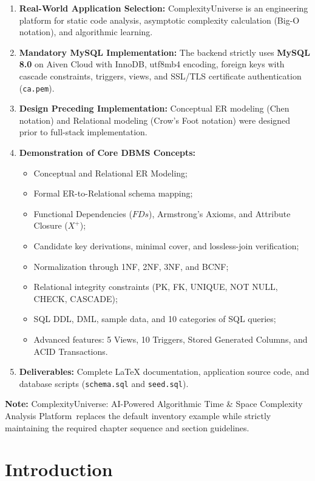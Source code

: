 \documentclass[12pt,a4paper]{report}
\DeclareRobustCommand{\_}{\textunderscore\allowbreak}
\newcommand{\projecttitle}{ComplexityUniverse: AI-Powered Algorithmic Time \& Space Complexity Analysis Platform}
\begin{document}
\begin{enumerate}
    \item \textbf{Real-World Application Selection:} ComplexityUniverse is an engineering platform for static code analysis, asymptotic complexity calculation (Big-O notation), and algorithmic learning.
    \item \textbf{Mandatory MySQL Implementation:} The backend strictly uses \textbf{MySQL 8.0} on Aiven Cloud with InnoDB, utf8mb4 encoding, foreign keys with cascade constraints, triggers, views, and SSL/TLS certificate authentication (\texttt{ca.pem}).
    \item \textbf{Design Preceding Implementation:} Conceptual ER modeling (Chen notation) and Relational modeling (Crow's Foot notation) were designed prior to full-stack implementation.
    \item \textbf{Demonstration of Core DBMS Concepts:}
    \begin{itemize}
        \item Conceptual and Relational ER Modeling;
        \item Formal ER-to-Relational schema mapping;
        \item Functional Dependencies ($FDs$), Armstrong's Axioms, and Attribute Closure ($X^+$);
        \item Candidate key derivations, minimal cover, and lossless-join verification;
        \item Normalization through 1NF, 2NF, 3NF, and BCNF;
        \item Relational integrity constraints (PK, FK, UNIQUE, NOT NULL, CHECK, CASCADE);
        \item SQL DDL, DML, sample data, and 10 categories of SQL queries;
        \item Advanced features: 5 Views, 10 Triggers, Stored Generated Columns, and ACID Transactions.
    \end{itemize}
    \item \textbf{Deliverables:} Complete LaTeX documentation, application source code, and database scripts (\texttt{schema.sql} and \texttt{seed.sql}).
\end{enumerate}

\noindent\textbf{Note:} \projecttitle\ replaces the default inventory example while strictly maintaining the required chapter sequence and section guidelines.

\chapter{Introduction}
\end{document}
